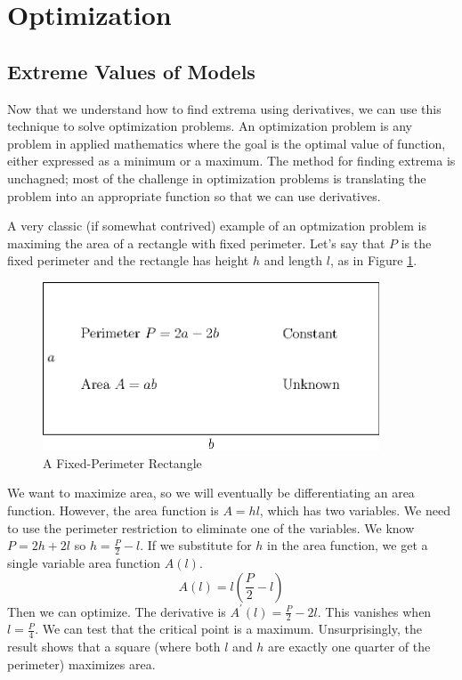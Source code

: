 \documentclass[fleqn]{report}
\begin{document}
\section{Optimization}
\label{optimization}

\subsection{Extreme Values of Models}
\label{models-exterem-values}

Now that we understand how to find extrema using derivatives,
we can use this technique to solve optimization problems.  An
optimization problem is any problem in applied mathematics
where the goal is the optimal value of function, either
expressed as a minimum or a maximum. The method for finding
extrema is unchagned; most of the challenge in optimization
problems is translating the problem into an appropriate
function so that we can use derivatives.

\begin{example}
A very classic (if somewhat contrived) example of an
optmization problem is maximing the area of a rectangle with
fixed perimeter. Let's say that $P$ is the fixed perimeter and
the rectangle has height $h$ and length $l$, as in Figure
\ref{figure-fixed-perimeter-rectangle}.

\begin{figure}[t]
\centering
\includegraphics[width=10cm]{figure56.eps}
\caption{A Fixed-Perimeter Rectangle}
\label{figure-fixed-perimeter-rectangle}
\end{figure}

We want to maximize area, so we will eventually be
differentiating an area function. However, the area function
is $A = hl$, which has two variables. We need to
use the perimeter restriction to eliminate one of the
variables. We know $P = 2h + 2l$ so $h = \frac{P}{2} - l$.
If we substitute for $h$ in the area function, we get a single
variable area function $A(l)$.
\begin{equation*}
A(l) = l \left( \frac{P}{2} - l \right)
\end{equation*}
Then we can optimize. The derivative is $A^\prime(l) =
\frac{P}{2} - 2l$. This vanishes when $l = \frac{P}{4}$. We
can test that the critical point is a maximum. Unsurprisingly,
the result shows that a square (where both $l$ and $h$ are
exactly one quarter of the perimeter) maximizes area.
\end{example}
\end{document}
